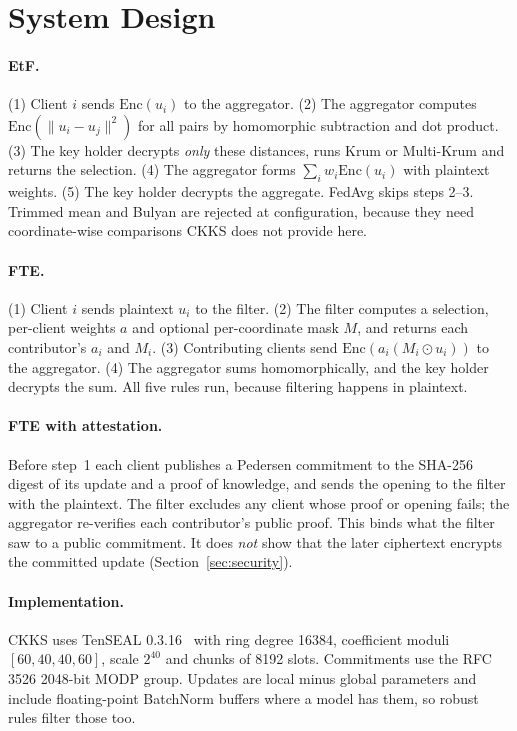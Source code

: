 \section{System Design}

\paragraph{EtF.}
(1) Client $i$ sends $\mathrm{Enc}(u_i)$ to the aggregator. (2) The aggregator computes $\mathrm{Enc}(\|u_i-u_j\|^2)$ for all pairs by homomorphic subtraction and dot product. (3) The key holder decrypts \emph{only} these distances, runs Krum or Multi-Krum and returns the selection. (4) The aggregator forms $\sum_i w_i\mathrm{Enc}(u_i)$ with plaintext weights. (5) The key holder decrypts the aggregate. FedAvg skips steps 2--3. Trimmed mean and Bulyan are rejected at configuration, because they need coordinate-wise comparisons CKKS does not provide here.

\paragraph{FTE.}
(1) Client $i$ sends plaintext $u_i$ to the filter. (2) The filter computes a selection, per-client weights $a$ and optional per-coordinate mask $M$, and returns each contributor's $a_i$ and $M_i$. (3) Contributing clients send $\mathrm{Enc}(a_i(M_i\odot u_i))$ to the aggregator. (4) The aggregator sums homomorphically, and the key holder decrypts the sum. All five rules run, because filtering happens in plaintext.

\paragraph{FTE with attestation.}
Before step~1 each client publishes a Pedersen commitment to the SHA-256 digest of its update and a proof of knowledge, and sends the opening to the filter with the plaintext. The filter excludes any client whose proof or opening fails; the aggregator re-verifies each contributor's public proof. This binds what the filter saw to a public commitment. It does \emph{not} show that the later ciphertext encrypts the committed update (Section~\ref{sec:security}).

\paragraph{Implementation.}
CKKS uses TenSEAL 0.3.16~\cite{benaissa2021tenseal} with ring degree 16384, coefficient moduli $[60,40,40,60]$, scale $2^{40}$ and chunks of 8192 slots. Commitments use the RFC 3526 2048-bit MODP group. Updates are local minus global parameters and include floating-point BatchNorm buffers where a model has them, so robust rules filter those too.
